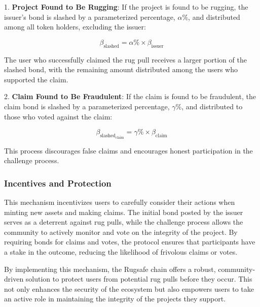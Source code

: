 \documentclass{article}
\begin{document}
1. \textbf{Project Found to Be Rugging}: If the project is found to be rugging, the issuer's bond is slashed by a parameterized percentage, \(\alpha\%\), and distributed among all token holders, excluding the issuer:

\[
\beta_{\text{slashed}} = \alpha\% \times \beta_{\text{issuer}}
\]

The user who successfully claimed the rug pull receives a larger portion of the slashed bond, with the remaining amount distributed among the users who supported the claim.

2. \textbf{Claim Found to Be Fraudulent}: If the claim is found to be fraudulent, the claim bond is slashed by a parameterized percentage, \(\gamma\%\), and distributed to those who voted against the claim:

\[
\beta_{\text{slashed}_{\text{claim}}} = \gamma\% \times \beta_{\text{claim}}
\]

This process discourages false claims and encourages honest participation in the challenge process.

\subsubsection{Incentives and Protection}

This mechanism incentivizes users to carefully consider their actions when minting new assets and making claims. The initial bond posted by the issuer serves as a deterrent against rug pulls, while the challenge process allows the community to actively monitor and vote on the integrity of the project. By requiring bonds for claims and votes, the protocol ensures that participants have a stake in the outcome, reducing the likelihood of frivolous claims or votes.

By implementing this mechanism, the Rugsafe chain offers a robust, community-driven solution to protect users from potential rug pulls before they occur. This not only enhances the security of the ecosystem but also empowers users to take an active role in maintaining the integrity of the projects they support.








\end{document}
